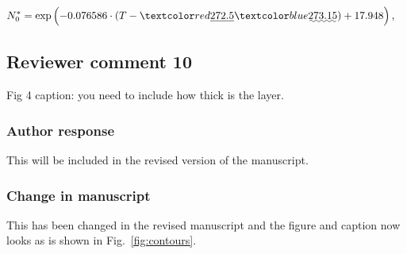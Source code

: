 \begin{change}[186]
\begin{align}
N_0^* &= \exp \left ( -0.076586 \cdot (T - \DIFdelbegin \DIFdel{272.5}\DIFdelend \DIFaddbegin \DIFadd{273.15}\DIFaddend ) + 17.948 \right ),
\end{align}
\end{change}

\subsection*{Reviewer comment 10}
Fig 4 caption: you need to include how thick is the layer.

\subsubsection*{Author response}
This will be included in the revised version of the manuscript.

\subsubsection*{Change in manuscript}

This has been changed in the revised manuscript and the figure and
caption now looks as is shown in Fig.~\ref{fig:contours}.






